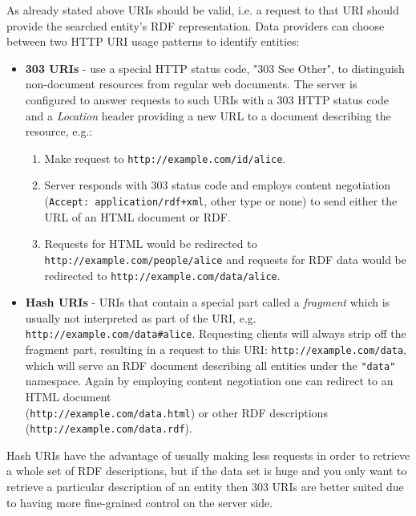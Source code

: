 As already stated above URIs should be valid, i.e. a request to that URI should provide the searched entity's RDF representation. Data providers can choose between two HTTP URI usage patterns to identify entities:
\begin{itemize}
    \item \textbf{303 URIs} - use a special HTTP status code, "303 See Other", to distinguish non-document resources from regular web documents. The server is configured to answer requests to such URIs with a 303 HTTP status code and a \textit{Location} header providing a new URL to a document describing the resource, e.g.:
    \begin{enumerate}
        \item Make request to \verb|http://example.com/id/alice|.
        \item Server responds with 303 status code and employs content negotiation (\verb|Accept: application/rdf+xml|, other type or none) to send either the URL of an HTML document or RDF.
        \item Requests for HTML would be redirected to \\ \verb|http://example.com/people/alice| and requests for RDF data would be redirected to \verb|http://example.com/data/alice|.
    \end{enumerate}
    \item \textbf{Hash URIs} - URIs that contain a special part called a \textit{fragment} which is usually not interpreted as part of the URI, e.g. \verb|http://example.com/data#alice|. Requesting clients will always strip off the fragment part, resulting in a request to this URI: \verb|http://example.com/data|, which will serve an RDF document describing all entities under the \verb|"data"| namespace. Again by employing content negotiation one can redirect to an HTML document \\ (\verb|http://example.com/data.html|) or other RDF descriptions \\ (\verb|http://example.com/data.rdf|).
\end{itemize}
Hash URIs have the advantage of usually making less requests in order to retrieve a whole set of RDF descriptions, but if the data set is huge and you only want to retrieve a particular description of an entity then 303 URIs are better suited due to having more fine-grained control on the server side.

